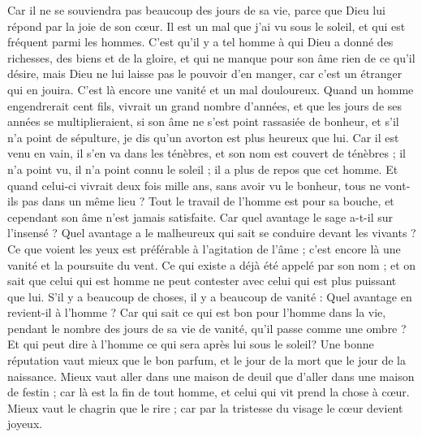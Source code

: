 \begin{multicols}{2}
Car il ne se souviendra pas beaucoup des jours de sa vie, parce que Dieu lui répond par la joie de son cœur.
\VerseOne{}Il est un mal que j'ai vu sous le soleil, et qui est fréquent parmi les hommes.
C'est qu'il y a tel homme à qui Dieu a donné des richesses, des biens et de la gloire, et qui ne manque pour son âme rien de ce qu'il désire, mais Dieu ne lui laisse pas le pouvoir d'en manger, car c'est un étranger qui en jouira. C'est là encore une vanité et un mal douloureux.
Quand un homme engendrerait cent fils, vivrait un grand nombre d'années, et que les jours de ses années se multiplieraient, si son âme ne s'est point rassasiée de bonheur, et s'il n'a point de sépulture, je dis qu'un avorton est plus heureux que lui.
Car il est venu en vain, il s'en va dans les ténèbres, et son nom est couvert de ténèbres ;
il n'a point vu, il n'a point connu le soleil ; il a plus de repos que cet homme.
Et quand celui-ci vivrait deux fois mille ans, sans avoir vu le bonheur, tous ne vont-ils pas dans un même lieu ?
Tout le travail de l'homme est pour sa bouche, et cependant son âme n'est jamais satisfaite.
Car quel avantage le sage a-t-il sur l'insensé ? Quel avantage a le malheureux qui sait se conduire devant les vivants ?
Ce que voient les yeux est préférable à l'agitation de l'âme ; c'est encore là une vanité et la poursuite du vent.
Ce qui existe a déjà été appelé par son nom ; et on sait que celui qui est homme ne peut contester avec celui qui est plus puissant que lui.
S'il y a beaucoup de choses, il y a beaucoup de vanité : Quel avantage en revient-il à l'homme ?
Car qui sait ce qui est bon pour l'homme dans la vie, pendant le nombre des jours de sa vie de vanité, qu'il passe comme une ombre ? Et qui peut dire à l'homme ce qui sera après lui sous le soleil?
\VerseOne{}Une bonne réputation vaut mieux que le bon parfum, et le jour de la mort que le jour de la naissance.
Mieux vaut aller dans une maison de deuil que d'aller dans une maison de festin ; car là est la fin de tout homme, et celui qui vit prend la chose à cœur.
Mieux vaut le chagrin que le rire ; car par la tristesse du visage le cœur devient joyeux.

\end{multicols}
